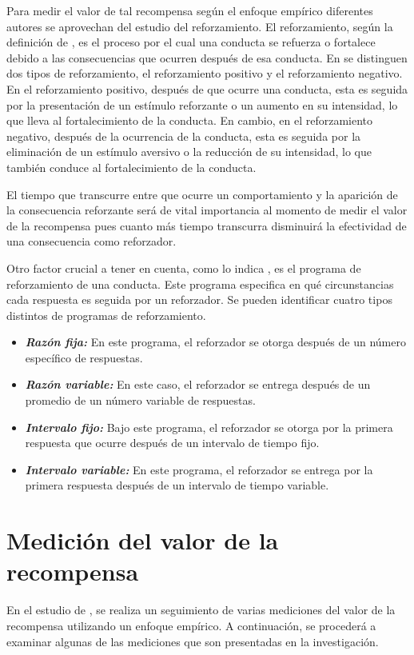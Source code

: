Para medir el valor de tal recompensa según el enfoque empírico diferentes autores se aprovechan del estudio del  reforzamiento. El reforzamiento, según la definición de \parencite{miltenberger2012behavior}, es el proceso por el cual una conducta se refuerza o fortalece debido a las consecuencias que ocurren después de esa conducta. En \parencite{miltenberger2012behavior} se distinguen dos tipos de reforzamiento, el reforzamiento positivo y el reforzamiento negativo. En el reforzamiento positivo, después de que ocurre una conducta, esta es seguida por la presentación de un estímulo reforzante o un aumento en su intensidad, lo que lleva al fortalecimiento de la conducta. En cambio, en el reforzamiento negativo, después de la ocurrencia de la conducta, esta es seguida por la eliminación de un estímulo aversivo o la reducción de su intensidad, lo que también conduce al fortalecimiento de la conducta. 

El tiempo que transcurre entre que ocurre un comportamiento y la aparición de la consecuencia reforzante será de vital importancia al momento de medir el valor de la recompensa pues cuanto más tiempo transcurra disminuirá la efectividad de una consecuencia como reforzador. 

Otro factor crucial a tener en cuenta, como lo indica \textcite{miltenberger2012behavior}, es el programa de reforzamiento de una conducta. Este programa especifica en qué circunstancias cada respuesta es seguida por un reforzador. Se pueden identificar cuatro tipos distintos de programas de reforzamiento.
\begin{itemize}
    \item \textit{\textbf{Razón fija:}} En este programa, el reforzador se otorga después de un número específico de respuestas. 
    \item \textit{\textbf{Razón variable:}} En este caso, el reforzador se entrega después de un promedio de un número variable de respuestas. 
    \item \textit{\textbf{Intervalo fijo:}} Bajo este programa, el reforzador se otorga por la primera respuesta que ocurre después de un intervalo de tiempo fijo. 
    \item \textit{\textbf{Intervalo variable:}} En este programa, el reforzador se entrega por la primera respuesta después de un intervalo de tiempo variable. 
\end{itemize}

\section{Medición del valor de la recompensa}
En el estudio de \parencite{buritica2016valor}, se realiza un seguimiento de varias mediciones del valor de la recompensa utilizando un enfoque empírico. A continuación, se procederá a examinar algunas de las mediciones que son presentadas en la investigación.

